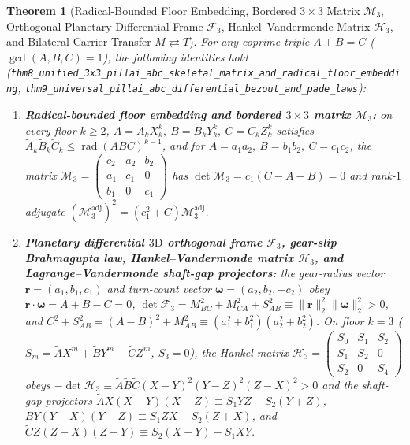 \documentclass[11pt,a4paper]{article}
\theoremstyle{plain}
\newtheorem{theorem}{Theorem}[section]
\theoremstyle{definition}
\begin{document}
\begin{theorem}[Radical-Bounded Floor Embedding, Bordered $3\times 3$ Matrix $\mathcal{M}_3$, Orthogonal Planetary Differential Frame $\mathcal{F}_3$, Hankel--Vandermonde Matrix $\mathcal{H}_3$, and Bilateral Carrier Transfer $M\rightleftarrows T$]
\label{thm:main-8}
For any coprime triple $A + B = C$ ($\gcd(A,B,C)=1$), the following identities hold (\texttt{thm8\_unified\_3x3\_pillai\_abc\_skeletal\_matrix\_and\_radical\_floor\_embedding}, \texttt{thm9\_universal\_pillai\_abc\_differential\_bezout\_and\_pade\_laws}):
\begin{enumerate}[label=\textbf{(\roman*)},leftmargin=*]
\item \textbf{Radical-bounded floor embedding and bordered $3\times 3$ matrix $\mathcal{M}_3$:}
  on every floor $k\ge 2$, $A = \widetilde{A}_k X_k^k,\ B = \widetilde{B}_k Y_k^k,\ C = \widetilde{C}_k Z_k^k$ satisfies $\widetilde{A}_k\widetilde{B}_k\widetilde{C}_k \le \operatorname{rad}(ABC)^{k-1}$, and for $A = a_1 a_2,\ B = b_1 b_2,\ C = c_1 c_2$, the matrix $\mathcal{M}_3 = \begin{pmatrix} c_2 & a_2 & b_2 \\ a_1 & c_1 & 0 \\ b_1 & 0 & c_1 \end{pmatrix}$ has $\det\mathcal{M}_3 = c_1(C-A-B) = 0$ and rank-$1$ adjugate $(\mathcal{M}_3^{\mathrm{adj}})^2 = (c_1^2+C)\mathcal{M}_3^{\mathrm{adj}}$.
\item \textbf{Planetary differential $3\mathrm{D}$ orthogonal frame $\mathcal{F}_3$, gear-slip Brahmagupta law, Hankel--Vandermonde matrix $\mathcal{H}_3$, and Lagrange--Vandermonde shaft-gap projectors:}
  the gear-radius vector $\mathbf{r} = (a_1,b_1,c_1)$ and turn-count vector $\mathbf{\omega} = (a_2,b_2,-c_2)$ obey $\mathbf{r}\cdot\mathbf{\omega} = A+B-C = 0$, $\det\mathcal{F}_3 = M_{BC}^2 + M_{CA}^2 + S_{AB}^2 \equiv \|\mathbf{r}\|_2^2\|\mathbf{\omega}\|_2^2 > 0$, and $C^2 + S_{AB}^2 = (A-B)^2 + M_{AB}^2 \equiv (a_1^2+b_1^2)(a_2^2+b_2^2)$. On floor $k=3$ ($S_m = \widetilde{A}X^m + \widetilde{B}Y^m - \widetilde{C}Z^m$, $S_3 = 0$), the Hankel matrix $\mathcal{H}_3 = \begin{pmatrix} S_0 & S_1 & S_2 \\ S_1 & S_2 & 0 \\ S_2 & 0 & S_4 \end{pmatrix}$ obeys $-\det\mathcal{H}_3 \equiv \widetilde{A}\widetilde{B}\widetilde{C}(X-Y)^2(Y-Z)^2(Z-X)^2 > 0$ and the shaft-gap projectors $\widetilde{A}X(X-Y)(X-Z) \equiv S_1 YZ - S_2(Y+Z)$, $\widetilde{B}Y(Y-X)(Y-Z) \equiv S_1 ZX - S_2(Z+X)$, and $\widetilde{C}Z(Z-X)(Z-Y) \equiv S_2(X+Y) - S_1 XY$.

\end{enumerate}
\end{theorem}
\end{document}
